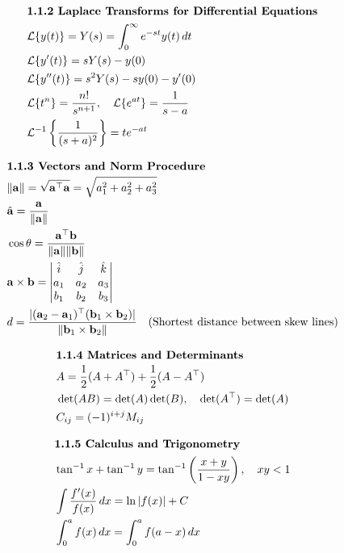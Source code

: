 \documentclass{article}
\begin{document}
\begin{align}
\intertext{\textbf{1.1.2 Laplace Transforms for Differential Equations}}
& \mathcal{L}\{y(t)\} = Y(s) = \int_0^\infty e^{-st} y(t) \, dt \label{eq:laplace_def} \\
& \mathcal{L}\{y'(t)\} = s Y(s) - y(0) \label{eq:laplace_first_deriv} \\
& \mathcal{L}\{y''(t)\} = s^2 Y(s) - s y(0) - y'(0) \label{eq:laplace_second_deriv} \\
& \mathcal{L}\{t^n\} = \frac{n!}{s^{n+1}}, \quad \mathcal{L}\{e^{at}\} = \frac{1}{s - a} \label{eq:laplace_powers} \\
& \mathcal{L}^{-1}\left\{\frac{1}{(s+a)^2}\right\} = t e^{-at} \label{eq:laplace_shift}
\end{align}

\begin{align}
\intertext{\textbf{1.1.3 Vectors and Norm Procedure}}
& \|\mathbf{a}\| = \sqrt{\mathbf{a}^\top \mathbf{a}} = \sqrt{a_1^2 + a_2^2 + a_3^2} \label{eq:vector_norm} \\
& \hat{\mathbf{a}} = \frac{\mathbf{a}}{\|\mathbf{a}\|} \label{eq:unit_vector} \\
& \cos \theta = \frac{\mathbf{a}^\top \mathbf{b}}{\|\mathbf{a}\| \|\mathbf{b}\|} \label{eq:angle_between} \\
& \mathbf{a} \times \mathbf{b} = \begin{vmatrix} \hat{i} & \hat{j} & \hat{k} \\ a_1 & a_2 & a_3 \\ b_1 & b_2 & b_3 \end{vmatrix} \label{eq:cross_prod} \\
& d = \frac{|(\mathbf{a}_2 - \mathbf{a}_1)^\top (\mathbf{b}_1 \times \mathbf{b}_2)|}{\|\mathbf{b}_1 \times \mathbf{b}_2\|} \quad \text{(Shortest distance between skew lines)} \label{eq:shortest_dist}
\end{align}

\begin{align}
\intertext{\textbf{1.1.4 Matrices and Determinants}}
& A = \frac{1}{2}(A + A^\top) + \frac{1}{2}(A - A^\top) \label{eq:matrix_decomp} \\
& \det(AB) = \det(A)\det(B), \quad \det(A^\top) = \det(A) \label{eq:det_props} \\
& C_{ij} = (-1)^{i+j} M_{ij} \label{eq:cofactor}
\end{align}

\begin{align}
\intertext{\textbf{1.1.5 Calculus and Trigonometry}}
& \tan^{-1} x + \tan^{-1} y = \tan^{-1}\left(\frac{x+y}{1 - xy}\right), \quad xy < 1 \label{eq:arctan_sum} \\
& \int \frac{f'(x)}{f(x)} \, dx = \ln|f(x)| + C \label{eq:log_integral} \\
& \int_0^a f(x) \, dx = \int_0^a f(a - x) \, dx \label{eq:def_integral_prop}
\end{align}
\end{document}
